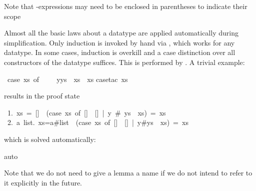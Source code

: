 \begin{isabellebody}
\begin{isamarkuptext}
\begin{quote}
\end{quote}

Note that -expressions may need to be enclosed in parentheses to
indicate their scope%
\end{isamarkuptext}%
%
%
\begin{isamarkuptext}%
Almost all the basic laws about a datatype are applied automatically during
simplification. Only induction is invoked by hand via ,
which works for any datatype. In some cases, induction is overkill and a case
distinction over all constructors of the datatype suffices. This is performed
by . A trivial example:%
\end{isamarkuptext}%
\ {\isachardoublequote}{\isacharparenleft}case\ xs\ of\ {\isacharbrackleft}{\isacharbrackright}\ {\isasymRightarrow}\ {\isacharbrackleft}{\isacharbrackright}\ {\isacharbar}\ y{\isacharhash}ys\ {\isasymRightarrow}\ xs{\isacharparenright}\ {\isacharequal}\ xs{\isachardoublequote}\isanewline
{}case{\isacharunderscore}tac\ xs{\isacharparenright}%
\begin{isamarkuptxt}%
\noindent
results in the proof state
\begin{isabelle}
~1.~xs~=~[]~{\isasymLongrightarrow}~(case~xs~of~[]~{\isasymRightarrow}~[]~|~y~\#~ys~{\isasymRightarrow}~xs)~=~xs\isanewline
~2.~{\isasymAnd}a~list.~xs=a\#list~{\isasymLongrightarrow}~(case~xs~of~[]~{\isasymRightarrow}~[]~|~y\#ys~{\isasymRightarrow}~xs)~=~xs%
\end{isabelle}
which is solved automatically:%
\end{isamarkuptxt}%
auto{\isacharparenright}%
\begin{isamarkuptext}%
Note that we do not need to give a lemma a name if we do not intend to refer
to it explicitly in the future.%
\end{isamarkuptext}%
\end{isabellebody}%
